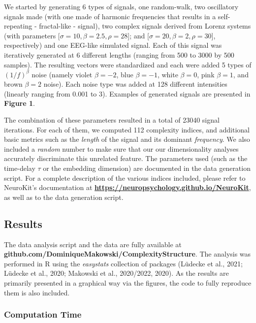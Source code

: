 \documentclass[
  man]{apa6}
\begin{document}
We started by generating 6 types of signals, one random-walk, two oscillatory signals made (with one made of harmonic frequencies that results in a self-repeating - fractal-like - signal), two complex signals derived from Lorenz systems (with parameters {[}\(\sigma = 10, \beta = 2.5, \rho = 28\){]}; and {[}\(\sigma = 20, \beta = 2, \rho = 30\){]}, respectively) and one EEG-like simulated signal. Each of this signal was iteratively generated at 6 different lengths (ranging from 500 to 3000 by 500 samples). The resulting vectors were standardized and each were added 5 types of \((1/f)^\beta\) noise (namely violet \(\beta=-2\), blue \(\beta=-1\), white \(\beta=0\), pink \(\beta=1\), and brown \(\beta=2\) noise). Each noise type was added at 128 different intensities (linearly ranging from 0.001 to 3). Examples of generated signals are presented in \textbf{Figure 1}.

The combination of these parameters resulted in a total of 23040 signal iterations. For each of them, we computed 112 complexity indices, and additional basic metrics such as the \emph{length} of the signal and its dominant \emph{frequency}. We also included a \emph{random} number to make sure that our our dimensionality analyses accurately discriminate this unrelated feature. The parameters used (such as the time-delay \(\tau\) or the embedding dimension) are documented in the data generation script. For a complete description of the various indices included, please refer to NeuroKit's documentation at \textbf{\url{https://neuropsychology.github.io/NeuroKit}}, as well as to the data generation script.

\hypertarget{results}{%
\subsection{Results}\label{results}}

The data analysis script and the data are fully available at
\textbf{github.com/DominiqueMakowski/ComplexityStructure}.
The analysis was performed in R using the \emph{easystats} collection of packages (Lüdecke et al., 2021; Lüdecke et al., 2020; Makowski et al., 2020/2022, 2020). As the results are primarily presented in a graphical way via the figures, the code to fully reproduce them is also included.

\hypertarget{computation-time}{%
\subsubsection{Computation Time}\label{computation-time}}
\end{document}
